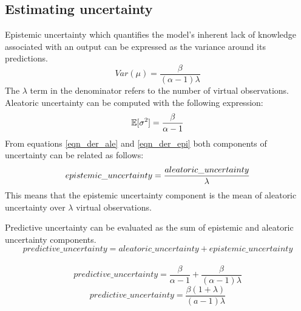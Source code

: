 	\subsection{Estimating uncertainty}
	Epistemic uncertainty which quantifies the model's inherent lack of knowledge associated with an output can be expressed as the variance around its predictions.
	\begin{equation}\label{eqn_der_epi}
		Var(\mu) = \frac{\beta}{(\alpha - 1)\lambda}
	\end{equation}
	The $\lambda$ term in the denominator refers to the number of virtual observations.
	Aleatoric uncertainty can be computed with the following expression:
	\begin{equation}\label{eqn_der_ale}
		\centering
		\mathbb{E}[\sigma^2]=\frac{\beta}{\alpha -1}
	\end{equation}
	From equations \ref{eqn_der_ale} and \ref{eqn_der_epi} both components of uncertainty can be related as follows:
	\begin{equation}
		\centering
		epistemic\_uncertainty = \frac{aleatoric\_uncertainty}{\lambda}
	\end{equation}
	This means that the epistemic uncertainty component is the mean of aleatoric uncertainty over $\lambda$ virtual observations.
	
	Predictive uncertainty can be evaluated as the sum of epistemic and aleatoric uncertainty components.
	\begin{equation}
		predictive\_uncertainty= aleatoric\_uncertainty + epistemic\_uncertainty
	\end{equation}
	\\
	\begin{equation}
		predictive\_uncertainty= \frac{\beta}{\alpha -1} + \frac{\beta}{(\alpha - 1)\lambda}
	\end{equation}
	\begin{equation}
		predictive\_uncertainty = \frac{\beta(1+\lambda)}{(a-1)\lambda}
	\end{equation}

